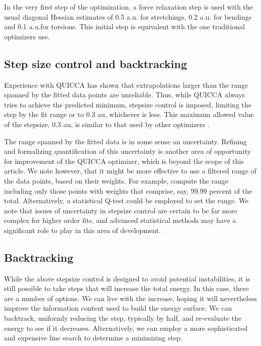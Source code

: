 \documentclass[prl,twocolumn,showpacs,twocolumngrid,superbib]{revtex4}
\begin{document}
In the very first step of the optimization, a force relaxation step is used with the usual 
diagonal Hessian estimates of 0.5 a.u. for stretchings, 0.2 a.u. for bendings and 0.1 a.u.for 
torsions.  This initial step is equivalent with the one traditional optimizers use.

\subsection{Step size control and backtracking}

Experience with QUICCA has shown that extrapolations larger 
than the range spanned by the fitted data points are unreliable.   Thus, 
while QUICCA  always tries to achieve the predicted minimum, 
stepsize control is imposed, limiting the step  by  the fit range or to 
0.3 au, whichever is less.   This maximum allowed value of the stepsize, 0.3 au, 
is similar to that used by other optimizers \cite{eckert}.  

The range spanned by the fitted data is in some sense an uncertainty.  
Refining and formalizing quantification of this uncertainty is another area of 
opportunity for improvement of the QUICCA optimizer, which is beyond the 
scope of this article.  We note however, that it might be more effective
to use a filtered range of the data points, based on their weights. 
For example, compute the range including only those points with weights that 
comprise, say,  99.99 percent of the total.   Alternatively, a statistical 
Q-test \cite{q-test} could be employed to set the range.  We note that issues of
uncertainty in stepsize control are certain to be far more complex for higher 
order fits, and advanced statistical methods may have a significant role 
to play in this area of development.

\subsection{Backtracking}

While the above stepsize control is designed to avoid potential instabilities,
it is still possible to take steps that will increase the total energy.  In 
this case, there are a number of options.  We can live with the increase, 
hoping it will nevertheless improve the information content used to build the energy 
surface.  We can backtrack, uniformly reducing the step, typically by half, and re-evaluate
the energy to see if it decreases.   Alternatively, we can employ a more 
sophisticated and expensive line search to determine a minimizing step.  
\end{document}
